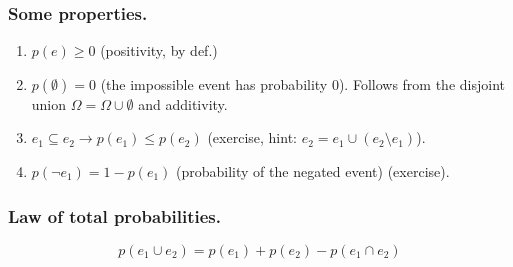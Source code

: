 \documentclass{beamer}
\begin{document}
\begin{frame}
  \frametitle{Some properties.}
  \begin{enumerate}
  \item $p(e) \ge 0$ (positivity, by def.)
  \item $p(\emptyset) = 0$ (the impossible event has probability $0$). Follows from the disjoint union $\Omega = \Omega \cup \emptyset$ and additivity.
  \item $e_1 \subseteq e_2 \rightarrow p(e_1) \le p(e_2)$ (exercise, hint: $e_2 = e_1 \cup (e_2 \setminus e_1)$).
  \item $p(\neg e_1) = 1 - p(e_1)$ (probability of the negated event) (exercise).
  \end{enumerate}
\end{frame}

\begin{frame}
  \frametitle{Law of total probabilities.}
  \[ p(e_1 \cup e_2) = p(e_1) + p(e_2) - p(e_1 \cap e_2)\]

\end{frame}
\end{document}
